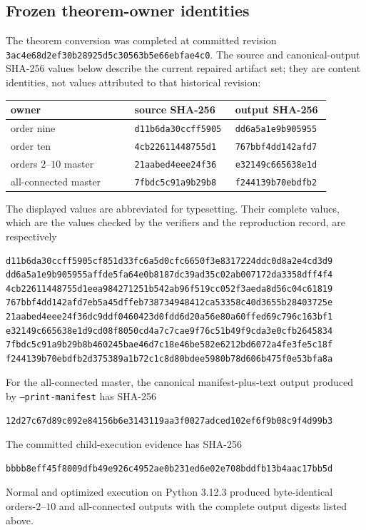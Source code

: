 \documentclass[11pt]{article}
\theoremstyle{definition}
\theoremstyle{remark}
\begin{document}
\subsection{Frozen theorem-owner identities}

The theorem conversion was completed at committed revision
\texttt{3ac4e68d2ef30b28925d5c30563b5e66ebfae4c0}.  The source and
canonical-output SHA-256 values below describe the current repaired artifact
set; they are content identities, not values attributed to that historical
revision:
\begin{center}
\small
\begin{tabular}{p{0.37\linewidth}p{0.26\linewidth}p{0.26\linewidth}}
\toprule
owner&source SHA-256&output SHA-256\\\midrule
order nine&\texttt{d11b6da30ccff5905}&\texttt{dd6a5a1e9b905955}\\
order ten&\texttt{4cb22611448755d1}&\texttt{767bbf4dd142afd7}\\
orders $2$--$10$ master&\texttt{21aabed4eee24f36}&\texttt{e32149c665638e1d}\\
all-connected master&\texttt{7fbdc5c91a9b29b8}&\texttt{f244139b70ebdfb2}\\
\bottomrule
\end{tabular}
\end{center}
The displayed values are abbreviated for typesetting.  Their complete values,
which are the values checked by the verifiers and the reproduction record, are
respectively
\begin{verbatim}
d11b6da30ccff5905cf851d33fc6a5d0cfc6650f3e8317224ddc0d8a2e4cd3d9
dd6a5a1e9b905955affde5fa64e0b8187dc39ad35c02ab007172da3358dff4f4
4cb22611448755d1eea984271251b542ab96f519cc052f3aeda8d56c04c61819
767bbf4dd142afd7eb5a45dffeb738734948412ca53358c40d3655b28403725e
21aabed4eee24f36dc9ddf0460423d0fdd6d20a56e80a60ffed69c796c163bf1
e32149c665638e1d9cd08f8050cd4a7c7cae9f76c51b49f9cda3e0cfb2645834
7fbdc5c91a9b29b8b460245bae46d7c18e46be582e6212bd6072a4fe3fe5c18f
f244139b70ebdfb2d375389a1b72c1c8d80bdee5980b78d606b475f0e53bfa8a
\end{verbatim}
For the all-connected master, the canonical manifest-plus-text output produced
by \texttt{--print-manifest} has SHA-256
\begin{verbatim}
12d27c67d89c092e84156b6e3143119aa3f0027adced102ef6f9b08c9f4d99b3
\end{verbatim}
The committed child-execution evidence has SHA-256
\begin{verbatim}
bbbb8eff45f8009dfb49e926c4952ae0b231ed6e02e708bddfb13b4aac17bb5d
\end{verbatim}
Normal and optimized execution on Python 3.12.3 produced byte-identical
orders-$2$--$10$ and all-connected outputs with the complete output digests
listed above.
\end{document}
